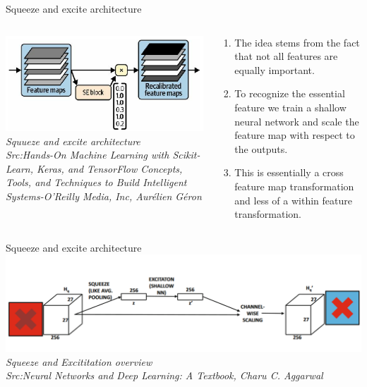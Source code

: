 \begin{frame}{Squeeze and excite architecture}
	\begin{columns}[T]
        \begin{column}{0.4\textwidth}
        	\includegraphics[width=\textwidth]{images/S&E.png}
			\tiny{\textit{Squueze and excite architecture\\ Src:Hands-On Machine Learning with Scikit-Learn, Keras, and TensorFlow  Concepts, Tools, and Techniques to Build Intelligent Systems-O'Reilly Media, Inc, Aurélien Géron }}
        \end{column}
		\begin{column}{0.6\textwidth}
			\begin{enumerate}[$\bullet$]
				\item The idea stems from the fact that not all features are equally important.\pause
				\item To recognize the essential feature we train a shallow neural network and scale the feature map  with respect to the outputs. \pause
				\item This is essentially a cross feature map transformation and less of a within feature transformation.
			\end{enumerate}
		\end{column} 
    \end{columns}
\end{frame}
\begin{frame}{Squeeze and excite architecture}
	\includegraphics[width=\textwidth]{images/SEoverview.png}
	\tiny{\textit{Squeeze and Excititation overview\\ Src:Neural Networks and Deep Learning: A Textbook, Charu C. Aggarwal }}
\end{frame}
